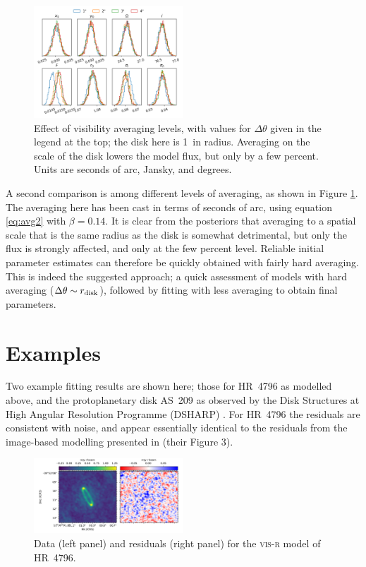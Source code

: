 \documentclass[fleqn,usenatbib]{mnras}
\begin{document}
\begin{figure}
    \centering
    \includegraphics[width=0.5\textwidth]{avg.png}
    \caption{Effect of visibility averaging levels, with values for $\Delta \theta$ given in the legend at the top; the disk here is 1\arcsec~in radius. Averaging on the scale of the disk lowers the model flux, but only by a few percent. Units are seconds of arc, Jansky, and degrees.}
    \label{fig:avg}
\end{figure}

A second comparison is among different levels of averaging, as shown in Figure \ref{fig:avg}. The averaging here has been cast in terms of seconds of arc, using equation \ref{eq:avg2} with $\beta=0.14$. It is clear from the posteriors that averaging to a spatial scale that is the same radius as the disk is somewhat detrimental, but only the flux is strongly affected, and only at the few percent level. Reliable initial parameter estimates can therefore be quickly obtained with fairly hard averaging. This is indeed the suggested approach; a quick assessment of models with hard averaging ($\Delta \theta \sim r_{\rm disk}$), followed by fitting with less averaging to obtain final parameters.

\section{Examples}

Two example fitting results are shown here; those for HR~4796 as modelled above, and the protoplanetary disk AS~209 as observed by the Disk Structures at High Angular Resolution Programme (DSHARP) \citep{2018ApJ...869L..48G}. For HR~4796 the residuals are consistent with noise, and appear essentially identical to the residuals from the image-based modelling presented in \citet{2018MNRAS.475.4924K} (their Figure 3).

\begin{figure}
    \centering
    \hspace{-0.5cm}\includegraphics[width=0.5\textwidth]{doc/resid_hr4796.pdf}
    \caption{Data (left panel) and residuals (right panel) for the \textsc{vis-r} model of HR~4796.}
    \label{fig:hr4796resid}
\end{figure}
\end{document}
